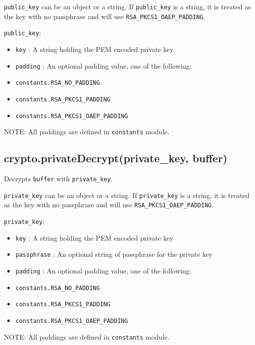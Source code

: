 \texttt{public\_key} can be an object or a string. If
\texttt{public\_key} is a string, it is treated as the key with no
passphrase and will use \texttt{RSA\_PKCS1\_OAEP\_PADDING}.

\texttt{public\_key}:

\begin{itemize}
\itemsep1pt\parskip0pt
\item
  \texttt{key} : A string holding the PEM encoded private key
\item
  \texttt{padding} : An optional padding value, one of the following:
\item
  \texttt{constants.RSA\_NO\_PADDING}
\item
  \texttt{constants.RSA\_PKCS1\_PADDING}
\item
  \texttt{constants.RSA\_PKCS1\_OAEP\_PADDING}
\end{itemize}

NOTE: All paddings are defined in \texttt{constants} module.

\subsection{crypto.privateDecrypt(private\_key,
buffer)}\label{crypto.privatedecryptprivateux5fkey-buffer}

Decrypts \texttt{buffer} with \texttt{private\_key}.

\texttt{private\_key} can be an object or a string. If
\texttt{private\_key} is a string, it is treated as the key with no
passphrase and will use \texttt{RSA\_PKCS1\_OAEP\_PADDING}.

\texttt{private\_key}:

\begin{itemize}
\itemsep1pt\parskip0pt
\item
  \texttt{key} : A string holding the PEM encoded private key
\item
  \texttt{passphrase} : An optional string of passphrase for the private
  key
\item
  \texttt{padding} : An optional padding value, one of the following:
\item
  \texttt{constants.RSA\_NO\_PADDING}
\item
  \texttt{constants.RSA\_PKCS1\_PADDING}
\item
  \texttt{constants.RSA\_PKCS1\_OAEP\_PADDING}
\end{itemize}

NOTE: All paddings are defined in \texttt{constants} module.

